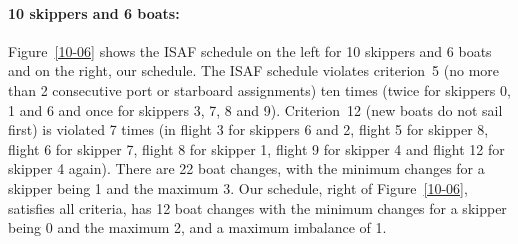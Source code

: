 \documentclass{llncs}
\begin{document}
\paragraph{10 skippers and 6 boats:} Figure~\ref{10-06} shows the ISAF schedule on the left for 10
skippers and 6 boats and on the right, our schedule.  The ISAF schedule violates criterion~5 (no more
than 2 consecutive port or starboard assignments) ten times (twice for skippers 0, 1 and 6 and once
for skippers 3, 7, 8 and 9).  Criterion~12 (new boats do not sail first) is violated 7 times (in
flight 3 for skippers 6 and 2, flight 5 for skipper 8, flight 6 for skipper 7, flight 8 for skipper
1, flight 9 for skipper 4 and flight 12 for skipper 4 again). There are 22 boat changes, with the
minimum changes for a skipper being 1 and the maximum 3. Our schedule, right of Figure~\ref{10-06},
satisfies all criteria, has 12 boat changes with the minimum changes for a skipper being 0 and the
maximum 2, and a maximum imbalance of 1.
\end{document}
